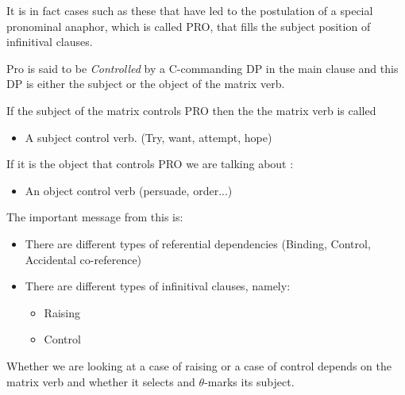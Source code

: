 \begin{frame}
  It is in fact cases such as these that have led to the postulation of a special pronominal anaphor, which is called PRO, that fills the subject position of infinitival clauses.


Pro is said to be \textit{Controlled}  by a C-commanding DP in the main clause and this DP is either the subject or the object of the matrix verb.
  
\end{frame}

\begin{frame}
  If the subject of the matrix controls PRO then the the matrix verb is called
  \begin{itemize}
  \item A subject control verb.  (Try, want, attempt, hope)
  \end{itemize}
If it is the object that controls PRO we are talking about :
\begin{itemize}
\item An object control verb (persuade, order...)
\end{itemize}

\end{frame}



\begin{frame}
  The important message from this is:

  \begin{itemize}
  \item There are different types of referential dependencies (Binding, Control, Accidental co-reference)
  \item There are different types of infinitival clauses, namely:
    \begin{itemize}
    \item Raising 
    \item Control
    \end{itemize}
  \end{itemize}

Whether we are looking at a case of raising or a case of control depends on the matrix verb and whether it selects and $\theta$-marks its subject.



\end{frame}








